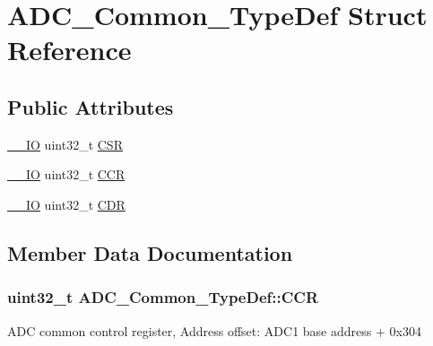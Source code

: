 \hypertarget{struct_a_d_c___common___type_def}{}\section{A\+D\+C\+\_\+\+Common\+\_\+\+Type\+Def Struct Reference}
\label{struct_a_d_c___common___type_def}
\subsection*{Public Attributes}
\begin{DoxyCompactItemize}
\item 
\hyperlink{core__sc300_8h_aec43007d9998a0a0e01faede4133d6be}{\+\_\+\+\_\+\+IO} uint32\+\_\+t \hyperlink{struct_a_d_c___common___type_def_ac38e24f600f9e134a54a0c43b976a4f4}{C\+SR}
\item 
\hyperlink{core__sc300_8h_aec43007d9998a0a0e01faede4133d6be}{\+\_\+\+\_\+\+IO} uint32\+\_\+t \hyperlink{struct_a_d_c___common___type_def_aee6d4af7571a1bad2fec9e7b53733277}{C\+CR}
\item 
\hyperlink{core__sc300_8h_aec43007d9998a0a0e01faede4133d6be}{\+\_\+\+\_\+\+IO} uint32\+\_\+t \hyperlink{struct_a_d_c___common___type_def_a6f7399bf70f677ef5de46a3038f414e1}{C\+DR}
\end{DoxyCompactItemize}


\subsection{Member Data Documentation}
\subsubsection[{\texorpdfstring{C\+CR}{CCR}}]{ uint32\+\_\+t A\+D\+C\+\_\+\+Common\+\_\+\+Type\+Def\+::\+C\+CR}\hypertarget{struct_a_d_c___common___type_def_aee6d4af7571a1bad2fec9e7b53733277}{}\label{struct_a_d_c___common___type_def_aee6d4af7571a1bad2fec9e7b53733277}
A\+DC common control register, Address offset\+: A\+D\+C1 base address + 0x304 

